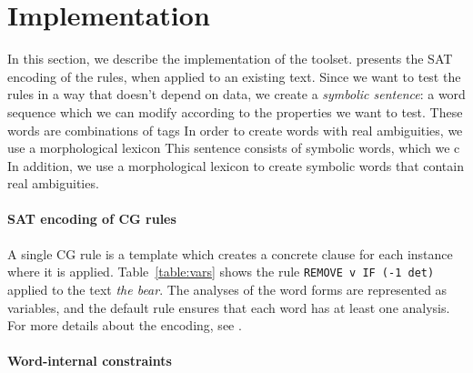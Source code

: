 \section{Implementation}
\label{sec:implementation}

In this section, we describe the implementation of the toolset.
\cite{listenmaa_claessen2015} presents the SAT encoding of the rules, when applied to an existing text.
Since we want to test the rules in a way that doesn't depend on data, we create a \emph{symbolic sentence}: a word sequence which we can modify according to the properties we want to test.
These words are combinations of tags
In order to create words with real ambiguities, we use a morphological lexicon
This sentence consists of symbolic words, which we c
In addition, we use a morphological lexicon to create symbolic words that contain real ambiguities.

\paragraph{SAT encoding of CG rules}

A single CG rule is a template which creates a concrete clause for each instance where it is applied.
Table~\ref{table:vars} shows the rule \texttt{REMOVE v IF (-1 det)} applied to the text \emph{the bear}.
The analyses of the word forms are represented as variables, and
the default rule ensures that each word has at least one analysis.
For more details about the encoding, see \cite{listenmaa_claessen2015}.




\paragraph{Word-internal constraints}


